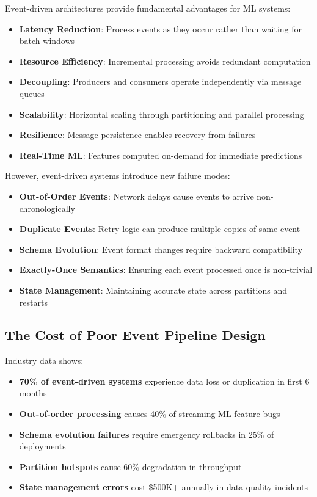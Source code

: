 Event-driven architectures provide fundamental advantages for ML systems:

\begin{itemize}
    \item \textbf{Latency Reduction}: Process events as they occur rather than waiting for batch windows
    \item \textbf{Resource Efficiency}: Incremental processing avoids redundant computation
    \item \textbf{Decoupling}: Producers and consumers operate independently via message queues
    \item \textbf{Scalability}: Horizontal scaling through partitioning and parallel processing
    \item \textbf{Resilience}: Message persistence enables recovery from failures
    \item \textbf{Real-Time ML}: Features computed on-demand for immediate predictions
\end{itemize}

However, event-driven systems introduce new failure modes:
\begin{itemize}
    \item \textbf{Out-of-Order Events}: Network delays cause events to arrive non-chronologically
    \item \textbf{Duplicate Events}: Retry logic can produce multiple copies of same event
    \item \textbf{Schema Evolution}: Event format changes require backward compatibility
    \item \textbf{Exactly-Once Semantics}: Ensuring each event processed once is non-trivial
    \item \textbf{State Management}: Maintaining accurate state across partitions and restarts
\end{itemize}

\subsection{The Cost of Poor Event Pipeline Design}

Industry data shows:
\begin{itemize}
    \item \textbf{70\% of event-driven systems} experience data loss or duplication in first 6 months
    \item \textbf{Out-of-order processing} causes 40\% of streaming ML feature bugs
    \item \textbf{Schema evolution failures} require emergency rollbacks in 25\% of deployments
    \item \textbf{Partition hotspots} cause 60\% degradation in throughput
    \item \textbf{State management errors} cost \$500K+ annually in data quality incidents
\end{itemize}

